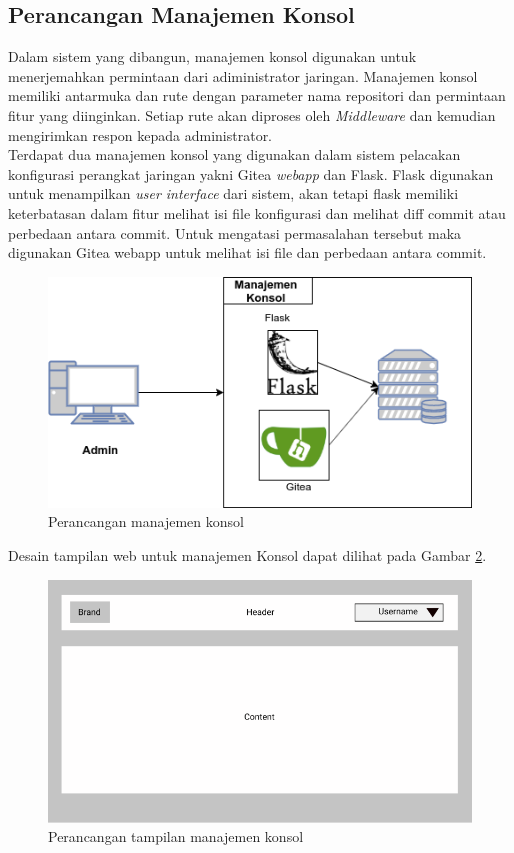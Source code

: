         \newpage
        \subsection{Perancangan Manajemen Konsol}
        	Dalam sistem yang dibangun, manajemen konsol digunakan untuk menerjemahkan permintaan dari adiministrator jaringan. Manajemen konsol memiliki antarmuka dan rute dengan parameter nama repositori dan permintaan fitur yang diinginkan. Setiap rute akan diproses oleh \textit{Middleware} dan kemudian mengirimkan respon kepada administrator.\\
        	\indent Terdapat dua manajemen konsol yang digunakan dalam sistem pelacakan konfigurasi perangkat jaringan yakni Gitea \textit{webapp} dan Flask. Flask digunakan untuk menampilkan \textit{user interface} dari sistem, akan tetapi flask memiliki keterbatasan dalam fitur melihat isi file konfigurasi dan melihat diff commit atau perbedaan antara commit. Untuk mengatasi permasalahan tersebut maka digunakan Gitea webapp untuk melihat isi file dan perbedaan antara commit.   
         	\begin{figure}[H]
         		\centering
         		\includegraphics[width=\textwidth]{Images/C-3/Manajemen-Konsol.png}
         		\caption{Perancangan manajemen konsol}
         		\label{ManajemenKonsol}
         	\end{figure}
         	
         	Desain tampilan web untuk manajemen Konsol dapat dilihat pada Gambar \ref{ManajemenKonsolUI}.
         		\begin{figure}[H]
         		\centering
         		\includegraphics[width=\textwidth]{Images/C-3/desainui.png}
         		\caption{Perancangan tampilan manajemen konsol}
         		\label{ManajemenKonsolUI}
         	\end{figure}
         
